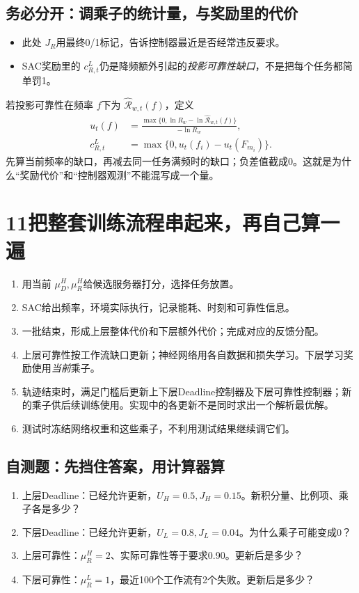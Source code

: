 \documentclass[UTF8,11pt,a4paper,fontset=fandol]{ctexart}
\newcommand{\lesson}[2]{\section*{#1\quad #2}}
\begin{document}
\subsection*{务必分开：调乘子的统计量，与奖励里的代价}
\begin{itemize}
\item 此处 $J_R$用最终0/1标记，告诉控制器最近是否经常违反要求。
\item SAC奖励里的 $c_{R,t}^L$仍是降频额外引起的\emph{投影可靠性缺口}，不是把每个任务都简单罚1。
\end{itemize}
若投影可靠性在频率 $f$下为 $\widehat{\mathcal R}_{w,t}(f)$，定义
\begin{align*}
u_t(f)&=\frac{\max\{0,\ln R_w-\ln\widehat{\mathcal R}_{w,t}(f)\}}{-\ln R_w},\\
c_{R,t}^L&=\max\{0,u_t(f_i)-u_t(F_{m_i})\}.
\end{align*}
先算当前频率的缺口，再减去同一任务满频时的缺口；负差值截成0。这就是为什么“奖励代价”和“控制器观测”不能混写成一个量。

\newpage
\lesson{11}{把整套训练流程串起来，再自己算一遍}
\begin{enumerate}
\item 用当前 $\mu_D^H,\mu_R^H$给候选服务器打分，选择任务放置。
\item SAC给出频率，环境实际执行，记录能耗、时刻和可靠性信息。
\item 一批结束，形成上层整体代价和下层额外代价；完成对应的反馈分配。
\item 上层可靠性按工作流缺口更新；神经网络用各自数据和损失学习。下层学习奖励使用\emph{当前}乘子。
\item 轨迹结束时，满足门槛后更新上下层Deadline控制器及下层可靠性控制器；新的乘子供后续训练使用。实现中的各更新不是同时求出一个解析最优解。
\item 测试时冻结网络权重和这些乘子，不利用测试结果继续调它们。
\end{enumerate}

\subsection*{自测题：先挡住答案，用计算器算}
\begin{enumerate}[label=\arabic*.]
\item 上层Deadline：已经允许更新，$U_H=0.5,J_H=0.15$。新积分量、比例项、乘子各是多少？
\item 下层Deadline：已经允许更新，$U_L=0.8,J_L=0.04$。为什么乘子可能变成0？
\item 上层可靠性：$\mu_R^H=2$、实际可靠性等于要求0.90。更新后是多少？
\item 下层可靠性：$\mu_R^L=1$，最近100个工作流有2个失败。更新后是多少？
\end{enumerate}
\end{document}
